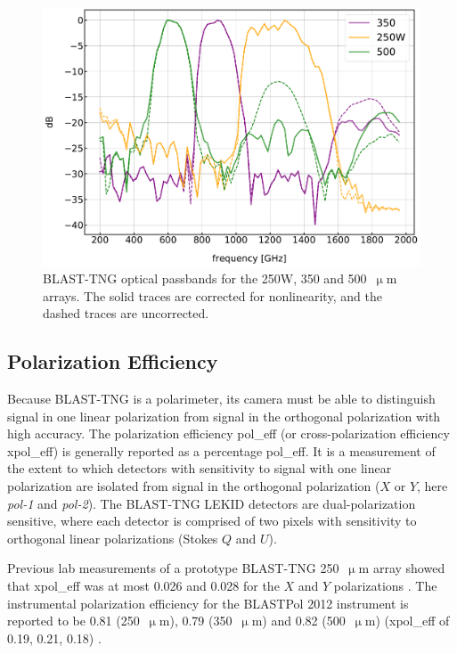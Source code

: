 \begin{figure}[!htbp]
\centering
\includegraphics[width=\textwidth]{figures/blast_data/fts/passbands_raw}
\caption[BLAST-TNG optical passbands for the 250W, 350 and  arrays.]{BLAST-TNG optical passbands for the 250W, 350 and 500~$\upmu$m arrays. The solid traces are corrected for nonlinearity, and the dashed traces are uncorrected.}
\label{fig:passbands_corr}
\end{figure}

\subsection{Polarization Efficiency}\label{pol eff}

Because BLAST-TNG is a polarimeter, its camera must be able to distinguish signal in one linear polarization from signal in the orthogonal polarization with high accuracy. The polarization efficiency \gls{pol_eff} (or cross-polarization efficiency \gls{xpol_eff}) is generally reported as a percentage \gls{pol_eff}. It is a measurement of the extent to which detectors with sensitivity to signal with one linear polarization are isolated from signal in the orthogonal polarization ($X$ or $Y$, here \textit{pol-1} and \textit{pol-2}). The BLAST-TNG LEKID detectors are dual-polarization sensitive, where each detector is comprised of two pixels with sensitivity to orthogonal linear polarizations (Stokes $Q$ and $U$).

Previous lab measurements of a prototype BLAST-TNG 250~$\upmu$m array showed that \gls{xpol_eff} was at most 0.026 and 0.028 for the $X$ and $Y$ polarizations \citep{dober2016optical}. The instrumental polarization efficiency for the BLASTPol 2012 instrument is reported to be 0.81 (250~$\upmu$m), 0.79 (350~$\upmu$m) and 0.82 (500~$\upmu$m) (\gls{xpol_eff} of 0.19, 0.21, 0.18) \citep{shariff2015polarimetry}.

